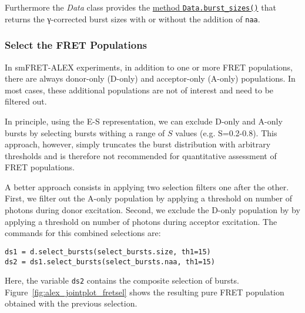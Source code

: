 Furthermore the \textit{Data} class provides the
\href{http://fretbursts.readthedocs.org/en/latest/data_class.html#fretbursts.burstlib.Data.burst_sizes}{method \texttt{Data.burst\_sizes()}} that returns the γ-corrected burst sizes with or
without the addition of \verb|naa|.

\subsubsection{Select the FRET Populations}

In smFRET-ALEX experiments, in addition to one or more FRET populations, there are always
donor-only (D-only) and acceptor-only (A-only) populations. 
In most cases, these additional populations are not of interest and need to be filtered out.

In principle, using the E-S representation, we can exclude D-only and A-only bursts
by selecting bursts withing a range of $S$ values (e.g. S=0.2-0.8). 
This approach, however, simply truncates the burst distribution with arbitrary 
thresholds and is therefore not recommended for quantitative assessment of FRET 
populations.

A better approach consists in applying two selection filters one after the other.
First, we filter out the A-only population 
by applying a threshold on number of photons during donor excitation.
Second, we exclude the D-only population by
by applying a threshold on number of photons during acceptor excitation.
The commands for this combined selections are:

\begin{lstlisting}
ds1 = d.select_bursts(select_bursts.size, th1=15)
ds2 = ds1.select_bursts(select_bursts.naa, th1=15)
\end{lstlisting}

Here, the variable \verb|ds2| contains the composite selection of bursts.
Figure~\ref{fig:alex_jointplot_fretsel} shows the resulting pure FRET
population obtained with the previous selection.